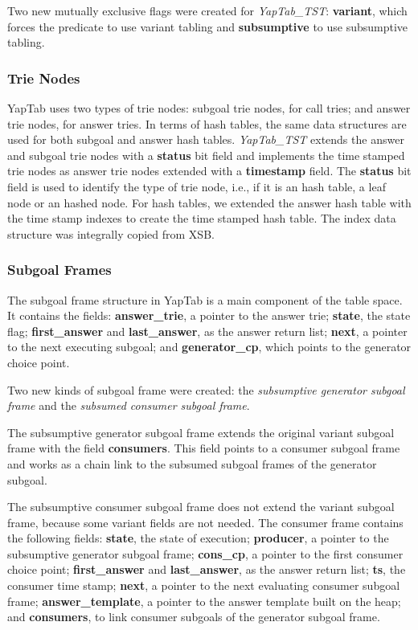 Two new mutually exclusive flags were created for \textit{YapTab\_TST}: \textbf{variant},
which forces the predicate to use variant tabling and \textbf{subsumptive} to use subsumptive tabling.

\subsubsection{Trie Nodes}

YapTab uses two types of trie nodes: subgoal trie nodes, for call tries; and answer trie nodes, for
answer tries. In terms of hash tables, the same data structures are used for both subgoal and answer
hash tables. \textit{YapTab\_TST} extends the answer and subgoal trie nodes with a \textbf{status}
bit field and implements the time stamped trie nodes as answer trie nodes extended with a \textbf{timestamp} field.
The \textbf{status} bit field is used to identify the type of trie node, i.e., if it is
an hash table, a leaf node or an hashed node.
For hash tables, we extended the answer hash table with the time stamp indexes to create the
time stamped hash table. The index data structure was integrally copied from XSB.

\subsubsection{Subgoal Frames}

The subgoal frame structure in YapTab is a main component of the table space.
It contains the fields: \textbf{answer\_trie}, a pointer to the answer trie;
\textbf{state}, the state flag; \textbf{first\_answer} and \textbf{last\_answer},
as the answer return list; \textbf{next}, a pointer to the next executing subgoal;
and \textbf{generator\_cp}, which points to the generator choice point.

Two new kinds of subgoal frame were created: the \textit{subsumptive generator subgoal frame} and
the \textit{subsumed consumer subgoal frame}.

The subsumptive generator subgoal frame extends the original variant subgoal frame
with the field \textbf{consumers}. This field points to a consumer subgoal frame and works
as a chain link to the subsumed subgoal frames of the generator subgoal.

The subsumptive consumer subgoal frame does not extend the variant subgoal frame, because
some variant fields are not needed.
The consumer frame contains the following fields: \textbf{state}, the state of execution;
\textbf{producer}, a pointer to the subsumptive generator subgoal frame; \textbf{cons\_cp},
a pointer to the first consumer choice point; \textbf{first\_answer} and \textbf{last\_answer},
as the answer return list; \textbf{ts}, the consumer time stamp;
\textbf{next}, a pointer to the next evaluating consumer subgoal frame; \textbf{answer\_template},
a pointer to the answer template built on the heap; and \textbf{consumers},
to link consumer subgoals of the generator subgoal frame.

